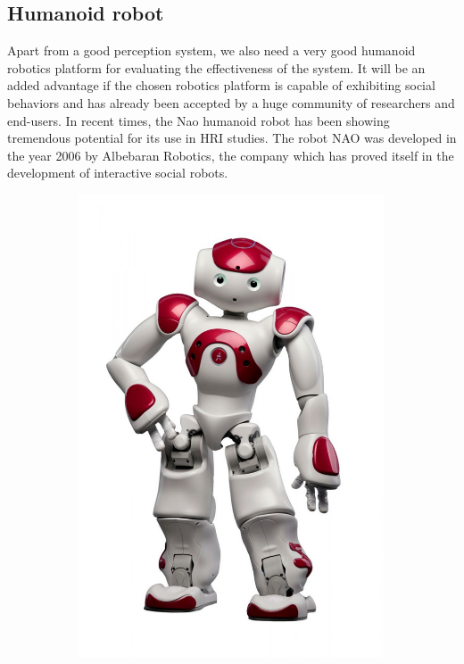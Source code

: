 \subsection{Humanoid robot}
Apart from a good perception system, we also need a very good humanoid robotics platform for evaluating the effectiveness of the system. It will be an added advantage if the chosen robotics platform is capable of exhibiting social behaviors and has already been accepted by a huge community of researchers and end-users. In recent times, the Nao humanoid robot \cite{NaoTheRobot} has been showing tremendous potential for its use in HRI studies. The robot NAO was developed in the year 2006 by Albebaran Robotics, the company which has proved itself in the development of interactive social robots.
\begin{figure}[H]
\centering
\begin{subfigure}[b]{0.25\textwidth}
\includegraphics[width=\textwidth]{assets/nao_image1.jpg}

\end{subfigure}
\end{figure}
